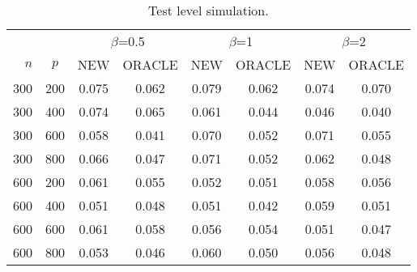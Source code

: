 \begin{table}[ht]

\caption{Test level simulation.} 
\label{biaoge1}
    \vspace{3mm}
\centering
\begin{tabular}{rccccccc}
    \toprule
     &  & \multicolumn{2}{c}{$\beta$=0.5} & \multicolumn{2}{c}{$\beta$=1}& \multicolumn{2}{c}{$\beta$=2}   \\
    \cmidrule(r){3-4}
    \cmidrule(r){5-6}
    \cmidrule(r){7-8}
$n$ & $p$ & NEW & ORACLE & NEW & ORACLE & NEW & ORACLE \\ 
\midrule
300 & 200 & 0.075 & 0.062 & 0.079 & 0.062 & 0.074 & 0.070 \\ 
  300 & 400 & 0.074 & 0.065 & 0.061 & 0.044 & 0.046 & 0.040 \\ 
  300 & 600 & 0.058 & 0.041 & 0.070 & 0.052 & 0.071 & 0.055 \\ 
  300 & 800 & 0.066 & 0.047 & 0.071 & 0.052 & 0.062 & 0.048 \\ 
  600 & 200 & 0.061 & 0.055 & 0.052 & 0.051 & 0.058 & 0.056 \\ 
  600 & 400 & 0.051 & 0.048 & 0.051 & 0.042 & 0.059 & 0.051 \\ 
  600 & 600 & 0.061 & 0.058 & 0.056 & 0.054 & 0.051 & 0.047 \\ 
  600 & 800 & 0.053 & 0.046 & 0.060 & 0.050 & 0.056 & 0.048 \\ 
   \bottomrule
\end{tabular}
\end{table}
